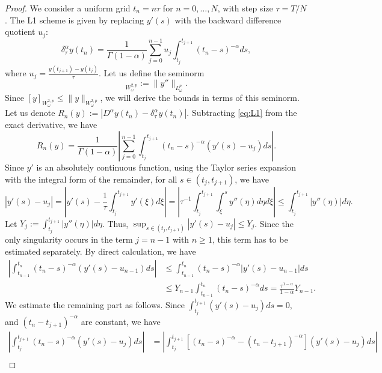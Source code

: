 \documentclass[10pt,a4paper]{amsart}
\begin{document}
\begin{proof}
We consider a uniform grid $t_n = n\tau$ for $n=0, \dots, N$, with step size $\tau = T/N$. The L1 scheme is given by replacing $y'(s)$ with the backward difference quotient $u_j$:
\begin{equation} \label{eq:L1}
    \delta_\tau^\alpha y(t_n) = \frac{1}{\Gamma(1-\alpha)} \sum_{j=0}^{n-1} u_j \int_{t_j}^{t_{j+1}} (t_n - s)^{-\alpha} ds,
\end{equation}
where $u_j = \frac{y(t_{j+1}) - y(t_j)}{\tau}$. Let us define the seminorm
\begin{equation}
    [y]_{W^{2,p}_\omega} := \|y''\|_{L^p_\omega}.
\end{equation}
Since $[y]_{W^{2,p}_\omega} \le \|y\|_{W^{2,p}_\omega}$, we will derive the bounds in terms of this seminorm. Let us denote $R_n(y) := |D^\alpha y(t_n) - \delta_\tau^\alpha y(t_n)|$. Subtracting \eqref{eq:L1} from the exact derivative, we have
\begin{equation} \label{eq:error_rep}
    R_n(y) = \frac{1}{\Gamma(1-\alpha)} \left|\sum_{j=0}^{n-1} \int_{t_j}^{t_{j+1}} (t_n - s)^{-\alpha} (y'(s) - u_j) ds \right|.
\end{equation}
Since $y'$ is an absolutely continuous function, using the Taylor series expansion with the integral form of the remainder, for all $s \in (t_j, t_{j+1})$, we have
\begin{equation}
    |y'(s) - u_j| = \left|y'(s) - \frac{1}{\tau}\int_{t_j}^{t_{j+1}} y'(\xi) d\xi\right| = \left|\tau^{-1} \int_{t_j}^{t_{j+1}} \int_{\xi}^s y''(\eta) d\eta d\xi\right| \le \int_{t_j}^{t_{j+1}} |y''(\eta)| d\eta.
\end{equation}
Let $Y_j := \int_{t_j}^{t_{j+1}} |y''(\eta)| d\eta$. Thus, $\sup_{s \in (t_j, t_{j+1})} |y'(s) - u_j| \le Y_j$. Since the only singularity occurs in the term $j = n - 1$ with $n \ge 1$, this term has to be estimated separately. By direct calculation, we have
\begin{align}
    \left|\int_{t_{n-1}}^{t_{n}} (t_n - s)^{-\alpha} (y'(s) - u_{n-1}) ds\right| &\le \int_{t_{n-1}}^{t_n} (t_n - s)^{-\alpha} |y'(s) - u_{n-1}| ds \nonumber \\
    &\le Y_{n-1} \int_{t_{n-1}}^{t_n} (t_n - s)^{-\alpha} ds = \frac{\tau^{1-\alpha}}{1-\alpha} Y_{n-1}.
\end{align}
We estimate the remaining part as follows. Since $\int_{t_j}^{t_{j+1}} (y'(s) - u_j) ds = 0$, and $(t_n - t_{j+1})^{-\alpha}$ are constant, we have
\begin{align}
    \left|\int_{t_j}^{t_{j+1}} (t_n - s)^{-\alpha} (y'(s) - u_j) ds\right| &= \left|\int_{t_j}^{t_{j+1}} \left[ (t_n - s)^{-\alpha} - (t_n - t_{j+1})^{-\alpha} \right] (y'(s) - u_j) ds \right| \nonumber \\

\end{align}
\end{proof}
\end{document}
